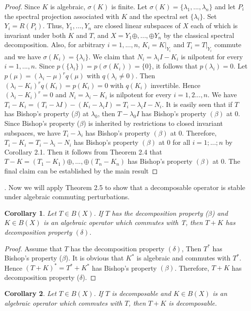 \documentclass[12pt,a4paper]{amsart}
\newtheorem{corollary}{Corollary}[section]
\begin{document}
\begin{proof}Since $K$ is algebraic, $\sigma(K)$ is finite. Let
$\sigma(K)=\{\lambda_{1},...,\lambda_{n}\}$ and let $P_{i}$ the
spectral projection associated with  $K$ and the spectral set
$\{\lambda_{i}\}$. Set $Y_{i}=R(P_{i})$. Thus, $Y_{1},...,Y_{n}$
are closed linear subspaces of $X$ each of which is invariant
under both $K$ and $T$, and $X=Y_{1}\oplus,...,\oplus Y_{n}$ by
the classical spectral decomposition. Also, for arbitrary
$i=1,...,n$, $K_{i}=K|_{Y_{i}}$ and $T_{i}=T|_{Y_{i}}$ commute and
we have $\sigma(K_{i})=\{\lambda_{i}\}$. We claim that
$N_{i}=\lambda_{i}I-K_{i}$ is nilpotent for every $i=1,...,n$.
Since $p(\{\lambda_{i}\})=p(\sigma(K_{i}))=\{0\}$, it follows that
$p(\lambda_{i})=0$. Let $p(\mu)=(\lambda_{i}-\mu)^{r}q(\mu)$ with
$q(\lambda_{i}\neq 0)$. Then
$(\lambda_{i}-K_{i})^{r}q(K_{i})=p(K_{i})=0$ with $q(K_{i})$
invertible. Hence $(\lambda_{i}-K_{i})^{r}=0$ and
$N_{i}=\lambda_{i}-K_{i}$ is nilpotent for every $i=1,2...,n$. We
have $T_{i}-K_{i}=(T_{i}-\lambda I)-(K_{i}-\lambda_{i}
I)=T_{i}-\lambda_{i}I-N_{i}$. It is easily seen that if $T$ has
Bishop's property ($\beta$) at $\lambda_{0}$, then $T -
\lambda_{0} I$ has Bishop's property $(\beta)$ at 0. Since
Bishop's property ($\beta$) is inherited by restrictions to closed
invariant subspaces, we have $T_{i}-\lambda_{i}$ has Bishop's
property $(\beta)$ at 0. Therefore, $T_{i}-K_{i} =
T_{i}-\lambda_{i}- N_{i}$ has Bishop's property $(\beta)$ at 0 for
all $i = 1; ...; n$ by Corollary 2.1. Then it follows from Theorem
2.4 that $T-K = (T_{1}-K_{1})\oplus,...,\oplus(T_{n}-K_{n})$ has
Bishop's property $(\beta)$ at 0. The final claim can be
established by the main result
\end{proof}.
Now we will apply Theorem 2.5 to show that a decomposable operator
is stable under algebraic commuting perturbations.

\begin{corollary} Let $T \in B(X)$. If $T$ has the decomposition
property ($\beta$) and $K\in B(X)$ is an algebraic operator which
commutes with T, then $T + K$ has decomposition property
$(\delta)$.
\end{corollary}
\begin{proof} Assume that $T$ has the decomposition property
$(\delta)$, Then $T^{*}$ has Bishop's property ($\beta$). It is
obvious that $K^{*}$ is algebraic and commutes with $T^{*}$. Hence
$(T +K)^{*} = T^{*} +K^{*}$ has Bishop's property $(\beta)$.
Therefore, $T + K$ has decomposition property ($\delta$).
\end{proof}
\begin{corollary} Let $T\in B(X)$. If $T$ is decomposable and $K \in B(X)$ is an
algebraic operator which commutes with $T$, then $T +K$ is
decomposable.
\end{corollary}
\end{document}
